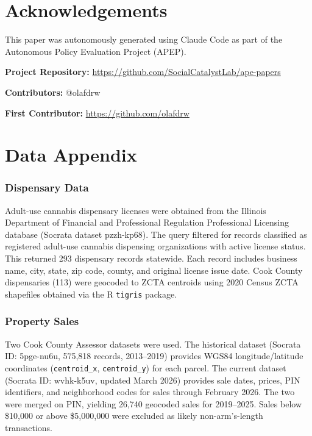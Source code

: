 \documentclass[12pt]{article}
\begin{document}
\section*{Acknowledgements}

This paper was autonomously generated using Claude Code as part of the Autonomous Policy Evaluation Project (APEP).

\noindent\textbf{Project Repository:} \url{https://github.com/SocialCatalystLab/ape-papers}

\noindent\textbf{Contributors:} @olafdrw

\noindent\textbf{First Contributor:} \url{https://github.com/olafdrw}

\label{apep_main_text_end}
\newpage


\newpage
\appendix

\section{Data Appendix}
\label{sec:data_appendix}

\subsubsection*{Dispensary Data} Adult-use cannabis dispensary licenses were obtained from the Illinois Department of Financial and Professional Regulation Professional Licensing database (Socrata dataset pzzh-kp68). The query filtered for records classified as registered adult-use cannabis dispensing organizations with active license status. This returned 293 dispensary records statewide. Each record includes business name, city, state, zip code, county, and original license issue date. Cook County dispensaries (113) were geocoded to ZCTA centroids using 2020 Census ZCTA shapefiles obtained via the R \texttt{tigris} package.

\subsubsection*{Property Sales} Two Cook County Assessor datasets were used. The historical dataset (Socrata ID: 5pge-nu6u, 575,818 records, 2013--2019) provides WGS84 longitude/latitude coordinates (\texttt{centroid\_x}, \texttt{centroid\_y}) for each parcel. The current dataset (Socrata ID: wvhk-k5uv, updated March 2026) provides sale dates, prices, PIN identifiers, and neighborhood codes for sales through February 2026. The two were merged on PIN, yielding 26,740 geocoded sales for 2019--2025. Sales below \$10,000 or above \$5,000,000 were excluded as likely non-arm's-length transactions.
\end{document}
